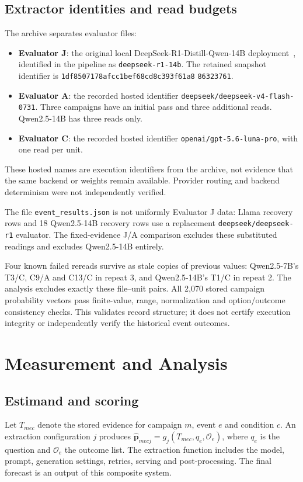 \documentclass[10pt,conference]{IEEEtran}
\begin{document}
\subsection{Extractor identities and read budgets}
\label{sec:evaluators}
The archive separates evaluator files:
\begin{itemize}
\item \textbf{Evaluator J}: the original local DeepSeek-R1-Distill-Qwen-14B
deployment~\cite{deepseekr1,deepseekcard}, identified in the pipeline as
\texttt{deepseek-r1-14b}. The retained snapshot identifier is
\texttt{1df8507178afcc1b}\allowbreak\texttt{ef68cd8c393f61a8}\allowbreak
\texttt{86323761}.
\item \textbf{Evaluator A}: the recorded hosted identifier
\texttt{deepseek/deepseek-v4-flash-0731}. Three campaigns have an initial
pass and three additional reads. Qwen2.5-14B has three reads only.
\item \textbf{Evaluator C}: the recorded hosted identifier
\texttt{openai/gpt-5.6-luna-pro}, with one read per unit.
\end{itemize}
These hosted names are execution identifiers from the archive, not evidence
that the same backend or weights remain available. Provider routing and
backend determinism were not independently verified.

The file \texttt{event\_results.json} is not uniformly Evaluator J data:
Llama recovery rows and 18 Qwen2.5-14B recovery rows use a replacement
\texttt{deepseek/deepseek-r1} evaluator. The fixed-evidence J/A comparison
excludes these substituted readings and excludes Qwen2.5-14B entirely.

Four known failed rereads survive as stale copies of previous values:
Qwen2.5-7B's T3/C, C9/A and C13/C in repeat 3, and Qwen2.5-14B's T1/C
in repeat 2. The analysis excludes exactly these file--unit pairs.
All 2,070 stored campaign probability vectors pass finite-value, range,
normalization and option/outcome consistency checks. This validates
record structure; it does not certify execution integrity or independently
verify the historical event outcomes.

\section{Measurement and Analysis}
\label{sec:methods}
\subsection{Estimand and scoring}
Let $T_{mec}$ denote the stored evidence for campaign $m$, event $e$ and
condition $c$. An extraction configuration $j$ produces
$\widehat{\mathbf p}_{mecj}=g_j(T_{mec},q_e,\mathcal O_e)$, where $q_e$ is the
question and $\mathcal O_e$ the outcome list. The extraction function includes
the model, prompt, generation settings, retries, serving and post-processing.
The final forecast is an output of this composite system.
\end{document}
